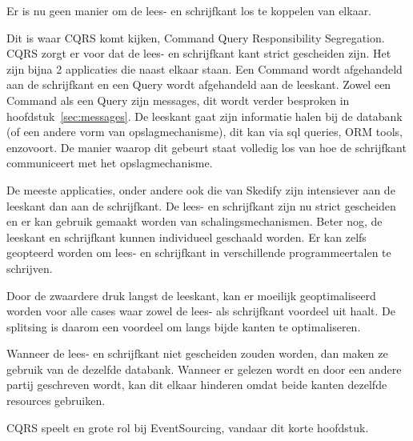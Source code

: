 Er is nu geen manier om de lees- en schrijfkant los te koppelen van elkaar.

Dit is waar CQRS komt kijken, Command Query Responsibility Segregation. CQRS zorgt er voor dat de lees- en schrijfkant kant strict gescheiden zijn. Het zijn bijna 2 applicaties die naast elkaar staan. Een Command wordt afgehandeld aan de schrijfkant en een Query wordt afgehandeld aan de leeskant. Zowel een Command als een Query zijn messages, dit wordt verder besproken in hoofdstuk~\ref{sec:messages}. De leeskant gaat zijn informatie halen bij de databank (of een andere vorm van opslagmechanisme), dit kan via sql queries, ORM tools, enzovoort. De manier waarop dit gebeurt staat volledig los van hoe de schrijfkant communiceert met het opslagmechanisme. 

De meeste applicaties, onder andere ook die van Skedify zijn intensiever aan de leeskant dan aan de schrijfkant. De lees- en schrijfkant zijn nu strict gescheiden en er kan gebruik gemaakt worden van schalingsmechanismen. Beter nog, de leeskant en schrijfkant kunnen individueel geschaald worden. Er kan zelfs geopteerd worden om lees- en schrijfkant in verschillende programmeertalen te schrijven.

Door de zwaardere druk langst de leeskant, kan er moeilijk geoptimaliseerd worden voor alle cases waar zowel de lees- als schrijfkant voordeel uit haalt. De splitsing is daarom een voordeel om langs bijde kanten te optimaliseren.

Wanneer de lees- en schrijfkant niet gescheiden zouden worden, dan maken ze gebruik van de dezelfde databank. Wanneer er gelezen wordt en door een andere partij geschreven wordt, kan dit elkaar hinderen omdat beide kanten dezelfde resources gebruiken.

CQRS speelt en grote rol bij EventSourcing, vandaar dit korte hoofdstuk.